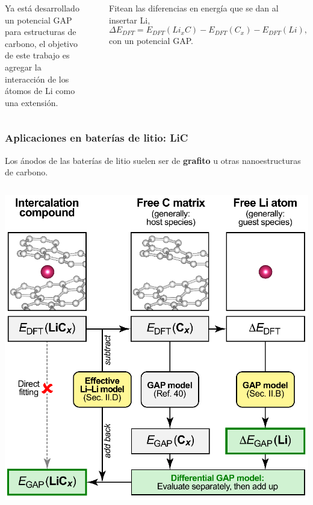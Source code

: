 \documentclass[aspectratio=169]{beamer}
\let\oldtextbf\textbf
\renewcommand{\textbf}[1]{\textcolor{nordblue}{\oldtextbf{#1}}}
\begin{document}
\begin{frame}
\begin{columns}
            \pause

            Ya está desarrollado un potencial GAP para estructuras de carbono, 
            el objetivo de este trabajo es agregar la interacción de los átomos
            de Li como una extensión.
            
            \ \pause

            Fitean las diferencias en energía que se dan al insertar Li,
            $$
            \Delta E_{DFT} = E_{DFT}(Li_xC) - E_{DFT}(C_x) - E_{DFT}(Li),
            $$
            con un potencial GAP.

        \end{columns}

    \end{frame}
    
    \begin{frame}
        \frametitle{Aplicaciones en baterías de litio: LiC}
            
        Los ánodos de las baterías de litio suelen ser de \textbf{grafito} u otras
        nanoestructuras de carbono.
        
        \begin{columns}
            \begin{center}
                \includegraphics[width=\columnwidth]{LiC-metodo.png}
            \end{center}


\end{columns}
\end{frame}
\end{document}
